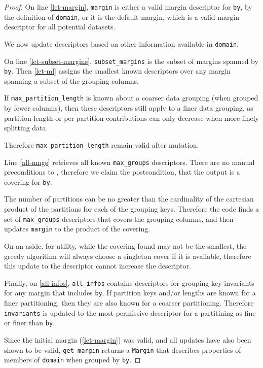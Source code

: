 \documentclass{article}
\begin{document}
\begin{proof} 
    On line \ref{let-margin}, \texttt{margin} is either a valid margin descriptor 
    for \texttt{by}, by the definition of \texttt{domain},
    or it is the default margin, which is a valid margin descriptor for all potential datasets. 

    We now update descriptors based on other information available in \texttt{domain}.

    On line \ref{let-subset-margins}, 
    \texttt{subset\_margins} is the subset of margins spanned by \texttt{by}.
    Then \ref{let-ml} assigns the smallest known descriptors over any margin spanning a subset of the grouping columns.

    If \texttt{max\_partition\_length} is known about a coarser data grouping (when grouped by fewer columns),
    then these descriptors still apply to a finer data grouping, as partition length or per-partition contributions 
    can only decrease when more finely splitting data.

    Therefore \texttt{max\_partition\_length} remain valid after mutation.

    Line \ref{all-mngs} retrieves all known \texttt{max\_groups} descriptors.
    There are no manual preconditions to , 
    therefore we claim the postcondition, that the output is a covering for \texttt{by}.

    The number of partitions can be no greater than the cardinality of the cartesian product of the partitions for each of the grouping keys.
    Therefore the code finds a set of \texttt{max\_groups} descriptors that covers the grouping columns,
    and then updates \texttt{margin} to the product of the covering.

    On an aside, for utility, while the covering found may not be the smallest, 
    the greedy algorithm will always choose a singleton cover if it is available,
    therefore this update to the descriptor cannot increase the descriptor.

    Finally, on \ref{all-infos}, \texttt{all\_infos} contains descriptors for grouping key invariants for any margin that includes \texttt{by}.
    If partition keys and/or lengths are known for a finer partitioning, then they are also known for a coarser partitioning.
    Therefore \texttt{invariants} is updated to the most permissive descriptor for a partitining as fine or finer than \texttt{by}.

    Since the initial margin (\ref{let-margin}) was valid, and all updates have also been shown to be valid,
    \texttt{get\_margin} returns a \texttt{Margin} that describes properties of members of \texttt{domain} when grouped by \texttt{by}.
\end{proof}
\end{document}
